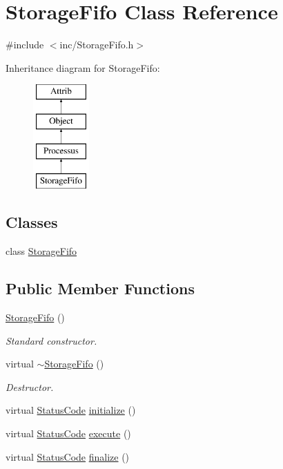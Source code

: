 \hypertarget{classStorageFifo}{}\section{Storage\+Fifo Class Reference}
\label{classStorageFifo}


{\ttfamily \#include $<$inc/\+Storage\+Fifo.\+h$>$}

Inheritance diagram for Storage\+Fifo\+:\begin{figure}[H]
\begin{center}
\leavevmode
\includegraphics[height=4.000000cm]{classStorageFifo}
\end{center}
\end{figure}
\subsection*{Classes}
\begin{DoxyCompactItemize}
\item 
class \hyperlink{classStorageFifo_1_1StorageFifo}{Storage\+Fifo}
\end{DoxyCompactItemize}
\subsection*{Public Member Functions}
\begin{DoxyCompactItemize}
\item 
\hyperlink{classStorageFifo_a223700b2d5de3bd59ccf76df29f979d3}{Storage\+Fifo} ()
\begin{DoxyCompactList}\small\item\em Standard constructor. \end{DoxyCompactList}\item 
virtual \hyperlink{classStorageFifo_a5c464d5913f8857b54462f982bfa8ea3}{$\sim$\+Storage\+Fifo} ()
\begin{DoxyCompactList}\small\item\em Destructor. \end{DoxyCompactList}\item 
virtual \hyperlink{classStatusCode}{Status\+Code} \hyperlink{classStorageFifo_a568becd5cb8d0cb5307a39e0d27fb332}{initialize} ()
\item 
virtual \hyperlink{classStatusCode}{Status\+Code} \hyperlink{classStorageFifo_aa6826007c79ce353640fd1b1836807ff}{execute} ()
\item 
virtual \hyperlink{classStatusCode}{Status\+Code} \hyperlink{classStorageFifo_aaa04959087ffc774dbb713f9910c6c04}{finalize} ()
\end{DoxyCompactItemize}
